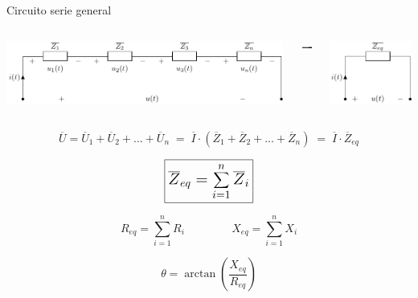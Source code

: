 \documentclass[aspectratio=169, usenames,svgnames,dvipsnames]{beamer}
\begin{document}
\begin{frame}[label={sec:orgb0700e8}]{Circuito serie general}
\begin{columns}
\begin{column}{0.6\columnwidth}
\begin{center}
\includegraphics[width=.9\linewidth]{../figs/serie_general.pdf}
\end{center}
\end{column}


\begin{column}{0.1\columnwidth}
\(\LARGE \xrightarrow{\hspace*{0.5cm}}\)
\end{column}

\begin{column}{0.3\columnwidth}
\begin{center}
\includegraphics[width=.9\linewidth]{../figs/serie_general_eq.pdf}
\end{center}
\end{column}
\end{columns}

\[\overline{U} = \overline{U}_1+\overline{U}_2+...+\overline{U}_n \; = \; \overline{I} \cdot(\overline{Z}_1+\overline{Z}_2+...+\overline{Z}_n) \; = \; \overline{I}\cdot\overline{Z}_{eq}\]


\[{\Large \boxed{ \overline{Z}_{eq} = \sum_{i=1}^n \overline{Z}_i} }\]

\[R_{eq}=\sum_{i=1}^n R_i\,\qquad \qquad X_{eq}=\sum_{i=1}^n X_i\]

\[\theta=\arctan\left(\dfrac{X_{eq}}{R_{eq}}\right)\]
\end{frame}
\end{document}
